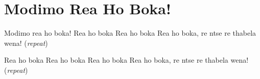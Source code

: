 \starttocol
\chapter{Modimo Rea Ho Boka!}
\nexttocol
\hfill{\it }
\stoptocol
\starttocol
\startlines
{\sc Modimo} rea ho boka!
Rea ho boka
Rea ho boka
Rea ho boka, re ntse re thabela wena!
          \hfill({\it repeat})~~~~~~~~~

Rea ho boka
Rea ho boka
Rea ho boka
Rea ho boka, re ntse re thabela wena!
          \hfill({\it repeat})~~~~~~~~~
\stoplines
\nexttocol

\stoptocol
